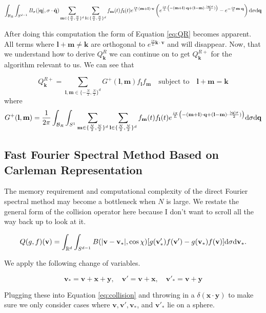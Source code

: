 \documentclass{article}
\def\t{\text}
\def\b{\mathbf}
\begin{document}
\begin{gather*}
    \int_{\mathcal{B}_R} \int_{S^{d-1}} B_{\sigma}(|\b q|, \sigma \cdot \hat{\b q}) \sum_{\b m \in \{\frac{N}{2}, \frac{N}{2} \}^d} \sum_{\b l \in \{\frac{N}{2}, \frac{N}{2} \}^d} f_{\b m}(t) f_{\b l}(t) e^{\frac{i \pi}{L} (\b m + \b l) \cdot \b v} \left( e^{\frac{i \pi}{L} \left( - (\b m + \b l) \cdot \b q + (\b l - \b m) \cdot \frac{|\b q| \sigma}{2} ) \right)}  - e^{- \frac{i \pi}{L} \b m \cdot \b q} \right) \t d \sigma \t d \b q \\ 
\end{gather*}

After doing this computation the form of Equation \ref{eq:QR} becomes apparent. All terms where $\b l + \b m \neq \b k$ are orthogonal to $e^{\frac{i \pi}{L} \b k \cdot \b v}$ and will disappear. Now, that we understand how to derive $Q^R_{\b k}$ we can continue on to get $Q^{R+}_{\b k}$ for the algorithm relevant to us. We can see that 

\[
Q^{R+}_{\b k} = \sum_{\b l,\b m \in \{-\frac{N}{2}, \frac{N}{2}\}^d} G^+(\b l,\b m) f_{\b l} f_{\b m} \quad \text{subject to} \quad \b l + \b m = \b k
\]
where 
\[
    G^+(\b l,\b m) = \frac{1}{2 \pi} \int_{\mathcal{B}_R} \int_{S^{1}} \sum_{\b m \in \{\frac{N}{2}, \frac{N}{2} \}^d} \sum_{\b l \in \{\frac{N}{2}, \frac{N}{2} \}^d} f_{\b m}(t) f_{\b l}(t) e^{\frac{i \pi}{L} \left( - (\b m + \b l) \cdot \b q + (\b l - \b m) \cdot \frac{|\b q| \sigma}{2} ) \right)}  \t d \sigma \t d \b q
\]

\subsection*{Fast Fourier Spectral Method Based on Carleman Representation}

The memory requirement and computational complexity of the direct Fourier spectral method may become a bottleneck when $N$ is large. We restate the general form of the collision operator here because I don't want to scroll all the way back up to look at it.

\[
    Q(g,f)(\b v) = \int_{\mathbb{R}^d} \int_{S^{d-1}} B(|\b v - \b v_*|,\cos \chi)[g(\b v_*') f(\b v') - g(\b v_*) f(\b v)] \t d \sigma \t d \b v_*.
\]

We apply the following change of variables.

\[
    \b v_* = \b v + \b x + \b y, \quad \b v' = \b v + \b x, \quad \b v'_* = \b v + \b y
\]

Plugging these into Equation \ref{eq:collision} and throwing in a $\delta(\b x \cdot \b y)$ to make sure we only consider cases where $\b v, \b v', \b v_*$, and $\b v'_*$ lie on a sphere.
\end{document}
